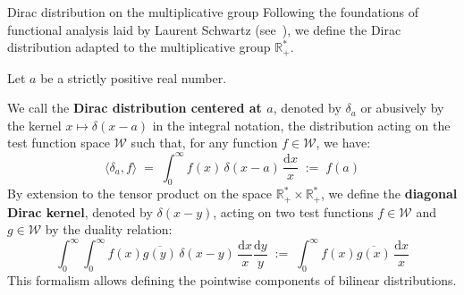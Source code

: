 \documentclass[Riemann_Hypothesis.tex]{subfiles}
\begin{document}
\begin{DefNefEn}[label=df:DistributionDiracMultiplicative]{Dirac distribution on the multiplicative group}
    Following the foundations of functional analysis laid by Laurent Schwartz 
    (see~\cite{schwartz1966_distributions_en}), we define the Dirac distribution adapted to the multiplicative group $\mathbb{R}_+^*$. \par
    Let $a$ be a strictly positive real number. \par
    We call the \textbf{Dirac distribution centered at $a$}, denoted by $\delta_a$ or abusively by the kernel $x \mapsto \delta(x-a)$ in the integral notation, the distribution acting on the test function space $\mathcal{W}$ such that, for any function $f \in \mathcal{W}$, we have:
    \begin{equation*}
        \langle \delta_a, f \rangle \;=\; \int_{0}^{\infty} f(x) \, \delta(x-a) \, \frac{\mathrm{d}x}{x} \;:=\; f(a)
    \end{equation*}
    By extension to the tensor product on the space $\mathbb{R}_+^* \times \mathbb{R}_+^*$, we define the \textbf{diagonal Dirac kernel}, denoted by $\delta(x-y)$, acting on two test functions $f \in \mathcal{W}$ and $g \in \mathcal{W}$ by the duality relation:
    \begin{equation*}
        \int_{0}^{\infty} \int_{0}^{\infty} f(x) \overline{g(y)} \, \delta(x-y) \, \frac{\mathrm{d}x}{x} \frac{\mathrm{d}y}{y} \;:=\; \int_{0}^{\infty} f(x) \overline{g(x)} \, \frac{\mathrm{d}x}{x}
    \end{equation*}
    This formalism allows defining the pointwise components of bilinear distributions.
\end{DefNefEn}
\end{document}
